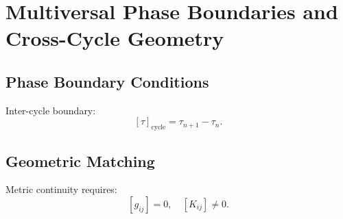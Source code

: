 \chapter{Multiversal Phase Boundaries and Cross-Cycle Geometry}

\section{Phase Boundary Conditions}
Inter-cycle boundary:
\[
[\tau]_{\mathrm{cycle}} = \tau_{n+1} - \tau_n.
\]

\section{Geometric Matching}
Metric continuity requires:
\[
[g_{ij}] = 0,\quad [K_{ij}] \neq 0.
\]

